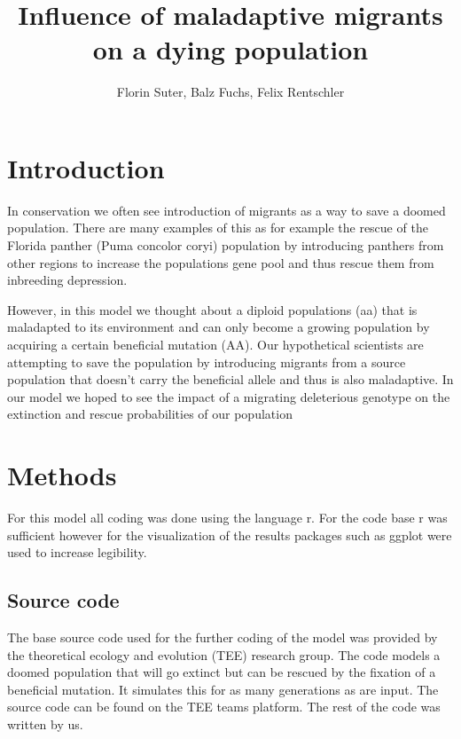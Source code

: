 \documentclass[
]{article}
\title{Influence of maladaptive migrants on a dying population}
\author{Florin Suter, Balz Fuchs, Felix Rentschler}
\date{}
\begin{document}
\maketitle

\hypertarget{introduction}{%
\section{Introduction}\label{introduction}}

In conservation we often see introduction of migrants as a way to save a
doomed population. There are many examples of this as for example the
rescue of the Florida panther (Puma concolor coryi) population by
introducing panthers from other regions to increase the populations gene
pool and thus rescue them from inbreeding depression.

However, in this model we thought about a diploid populations (aa) that
is maladapted to its environment and can only become a growing
population by acquiring a certain beneficial mutation (AA). Our
hypothetical scientists are attempting to save the population by
introducing migrants from a source population that doesn't carry the
beneficial allele and thus is also maladaptive. In our model we hoped to
see the impact of a migrating deleterious genotype on the extinction and
rescue probabilities of our population

\hypertarget{methods}{%
\section{Methods}\label{methods}}

For this model all coding was done using the language r. For the code
base r was sufficient however for the visualization of the results
packages such as ggplot were used to increase legibility.

\hypertarget{source-code}{%
\subsection{Source code}\label{source-code}}

The base source code used for the further coding of the model was
provided by the theoretical ecology and evolution (TEE) research group.
The code models a doomed population that will go extinct but can be
rescued by the fixation of a beneficial mutation. It simulates this for
as many generations as are input. The source code can be found on the
TEE teams platform. The rest of the code was written by us.
\end{document}
